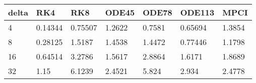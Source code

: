\begin{tabular}{lllllll}
delta & RK4 & RK8 & ODE45 & ODE78 & ODE113 & MPCI \\ 
\hline 
4 & 0.14344 & 0.75507 & 1.2622 & 0.7581 & 0.65694 & 1.3854 \\ 
8 & 0.28125 & 1.5187 & 1.4538 & 1.4472 & 0.77446 & 1.1798 \\ 
16 & 0.64514 & 3.2786 & 1.5617 & 2.8864 & 1.6171 & 1.8689 \\ 
32 & 1.15 & 6.1239 & 2.4521 & 5.824 & 2.934 & 2.4778 \\ 
\hline 
\end{tabular}